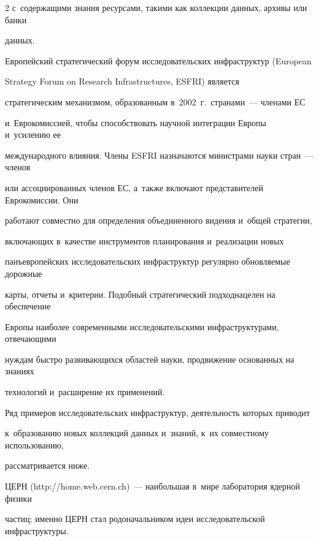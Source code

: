 \begin{multicols}{2}
с~содержащими знания ресурсами, такими как коллекции данных, архивы или банки 


данных.


  


  Европейский стратегический форум исследовательских инфраструктур (European


  Strategy Forum on Research Infrastructures, ESFRI) является 


стратегическим механизмом, образованным в~2002~г.\ странами~--- членами ЕС 


и~Еврокомиссией, чтобы способствовать научной интеграции Европы и~усилению ее 


международного влияния. Члены ESFRI назначаются министрами науки стран~--- членов 


или ассоциированных членов ЕС, а~также включают представителей Еврокомиссии. Они 


работают совместно для определения объединенного видения и~общей стратегии, 


включающих в~качестве инструментов планирования и~реализации новых 


панъевропейских исследовательских инфраструктур регулярно обновляемые дорожные 


карты, отче\-ты и~критерии. Подобный стратегический подход\linebreak нацелен на обеспечение 


Европы наиболее совре\-менными исследовательскими инфраструктурами, отвечающими 


нуждам быстро развивающихся областей науки, продвижение основанных на знаниях 


технологий и~расширение их применений.


  


  Ряд примеров исследовательских инфраструктур, деятельность которых приводит 


к~образованию новых коллекций данных и~знаний, к~их совместному использованию, 


рассматривается ниже.


  


  ЦЕРН ({\sf http://home.web.cern.ch})~--- наибольшая в~мире лаборатория ядерной физики 


частиц; именно ЦЕРН стал родоначальником идеи исследовательской инфраструктуры.


  



\end{multicols}
